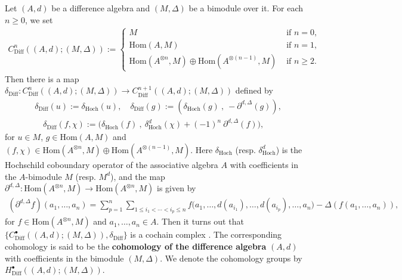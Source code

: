\documentclass[a4paper,reqno,10pt]{amsart}
\theoremstyle{plain}
\theoremstyle{definition}
\theoremstyle{remark}
\begin{document}
Let $(A, d)$ be a difference algebra and $(M, \Delta)$ be a bimodule over it. For each $n \geq 0$, we set
\begin{align*}
    C^n_\mathrm{Diff} ((A, d); (M, \Delta) ) := \begin{cases}
        M & \text{ if } n =0,\\
        \mathrm{Hom}(A, M) & \text{ if } n = 1, \\
        \mathrm{Hom} (A^{\otimes n} , M) \oplus \mathrm{Hom}  (A^{\otimes (n-1)} , M) & \text{ if } n \geq 2.
    \end{cases}
\end{align*}
Then there is a map $\delta_\mathrm{Diff} :  C^n_\mathrm{Diff} ((A, d); (M, \Delta) ) \rightarrow  C^{n+1}_\mathrm{Diff} ((A, d); (M, \Delta) )$ defined by
\begin{align*}
    &\delta_\mathrm{Diff} (u) := \delta_\mathrm{Hoch} (u), \quad \delta_\mathrm{Diff} (g) := (\delta_\mathrm{Hoch} (g) ~ \! , ~ \! - \partial^{d, \Delta} ( g ) ), \\
    & \quad \delta_\mathrm{Diff} (f, \chi) := \big( \delta_\mathrm{Hoch} (f) ~ \! , ~ \! \delta_\mathrm{Hoch}^d (\chi) + (-1)^n ~ \! \partial^{d, \Delta} (f)   \big),
\end{align*}
for $u \in M$, $g \in \mathrm{Hom}(A, M)$ and $(f, \chi) \in \mathrm{Hom} (A^{\otimes n} , M) \oplus \mathrm{Hom}  (A^{\otimes (n-1)} , M)$. Here $\delta_\mathrm{Hoch}$ (resp. $\delta_\mathrm{Hoch}^d$) is the Hochschild coboundary operator of the associative algebra $A$ with coefficients in the $A$-bimodule $M$ (resp. $M^d$), and the map $\partial^{d, \Delta} : \mathrm{Hom} (A^{\otimes n} , M) \rightarrow \mathrm{Hom} (A^{\otimes n} , M)$ is given by
\begin{align*}
    (\partial^{d, \Delta} f) (a_1, \ldots, a_n) = \sum_{p=1}^n \sum_{1 \leq i_1 < \cdots < i_p \leq n} f \big(   a_1, \ldots, d (a_{i_1}), \ldots, d (a_{i_p}), \ldots, a_n  \big) - \Delta ( f (a_1, \ldots, a_n)),
\end{align*}
for $f \in  \mathrm{Hom} (A^{\otimes n} , M) $ and $a_1, \ldots, a_n \in A$. Then it turns out that $\{ C^\bullet_\mathrm{Diff} ((A, d); (M, \Delta) ), \delta_\mathrm{Diff} \}$ is a cochain complex \cite{guo-li}. The corresponding cohomology is said to be the {\bf cohomology of the difference algebra} $(A, d)$ with coefficients in the bimodule $(M, \Delta)$. We denote the cohomology groups by $H^\bullet_\mathrm{Diff} ((A, d); (M, \Delta) ).$

\medskip

\medskip
\end{document}
